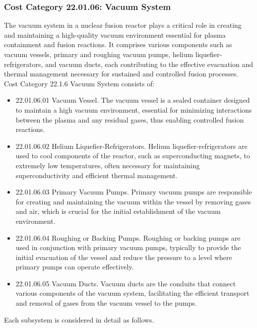 \subsubsection*{Cost Category 22.01.06: Vacuum System}

The vacuum system in a nuclear fusion reactor plays a critical role in creating and maintaining a high-quality vacuum environment essential for plasma containment and fusion reactions. It comprises various components such as vacuum vessels, primary and roughing vacuum pumps, helium liquefier-refrigerators, and vacuum ducts, each contributing to the effective evacuation and thermal management necessary for sustained and controlled fusion processes. Cost Category 22.1.6 Vacuum System consists of:  

\begin{itemize}
\item 22.01.06.01 Vacuum Vessel.  The vacuum vessel is a sealed container designed to maintain a high vacuum environment, essential for minimizing interactions between the plasma and any residual gases, thus enabling controlled fusion reactions.

\item 22.01.06.02 Helium Liquefier-Refrigerators. Helium liquefier-refrigerators are used to cool components of the reactor, such as superconducting magnets, to extremely low temperatures, often necessary for maintaining superconductivity and efficient thermal management.

\item 22.01.06.03 Primary Vacuum Pumps. Primary vacuum pumps are responsible for creating and maintaining the vacuum within the vessel by removing gases and air, which is crucial for the initial establishment of the vacuum environment.

\item 22.01.06.04 Roughing or Backing Pumps. Roughing or backing pumps are used in conjunction with primary vacuum pumps, typically to provide the initial evacuation of the vessel and reduce the pressure to a level where primary pumps can operate effectively.

\item 22.01.06.05 Vacuum Ducts. Vacuum ducts are the conduits that connect various components of the vacuum system, facilitating the efficient transport and removal of gases from the vacuum vessel to the pumps.
\end{itemize}

Each subsystem is considered in detail as follows. \\

